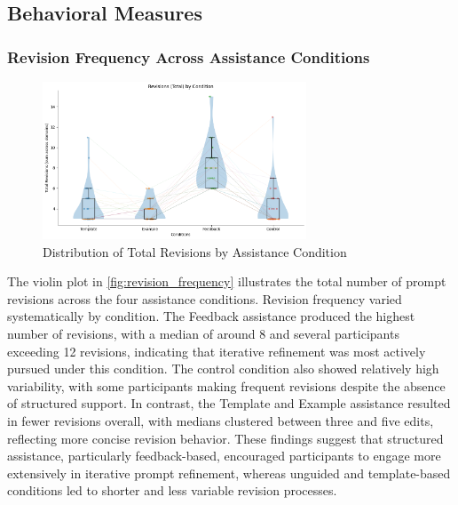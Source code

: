 \subsection{\textbf{Behavioral Measures}}
\subsubsection{Revision Frequency Across Assistance Conditions}
\FloatBarrier
\Needspace{:}

\begin{figure}[h]
\centering
\includegraphics[width=0.7\textwidth]{figures/07.png}
\caption{Distribution of Total Revisions by Assistance Condition}
\label{fig:revision_frequency}
\end{figure}

The violin plot in \autoref{fig:revision_frequency} illustrates the total number of prompt revisions across the four assistance conditions. Revision frequency varied systematically by condition. The Feedback assistance produced the highest number of revisions, with a median of around 8 and several participants exceeding 12 revisions, indicating that iterative refinement was most actively pursued under this condition. The control condition also showed relatively high variability, with some participants making frequent revisions despite the absence of structured support. In contrast, the Template and Example assistance resulted in fewer revisions overall, with medians clustered between three and five edits, reflecting more concise revision behavior. These findings suggest that structured assistance, particularly feedback-based, encouraged participants to engage more extensively in iterative prompt refinement, whereas unguided and template-based conditions led to shorter and less variable revision processes.

